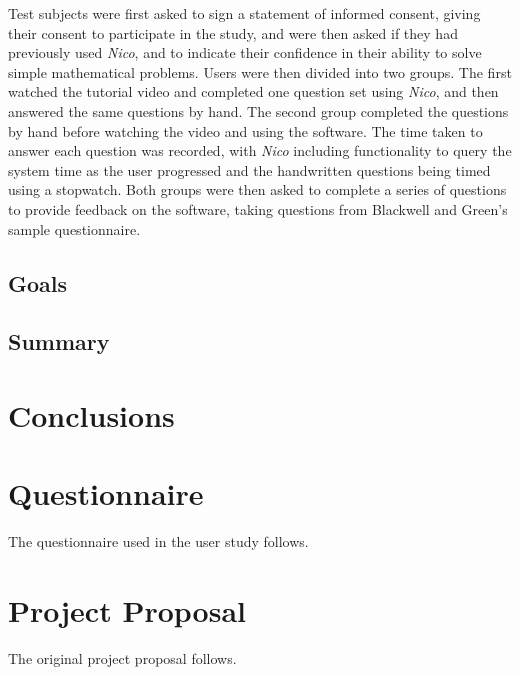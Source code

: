\documentclass[12pt,twoside,notitlepage,xetex]{report}
\begin{document}
Test subjects were first asked to sign a statement of informed consent, giving their consent to participate in the study, and were then asked if they had previously used \emph{Nico}, and to indicate their confidence in their ability to solve simple mathematical problems.  Users were then divided into two groups.  The first watched the tutorial video and completed one question set using \emph{Nico}, and then answered the same questions by hand.  The second group completed the questions by hand before watching the video and using the software.  The time taken to answer each question was recorded, with \emph{Nico} including functionality to query the system time as the user progressed and the handwritten questions being timed using a stopwatch.  Both groups were then asked to complete a series of questions to provide feedback on the software, taking questions from Blackwell and Green's sample questionnaire. \cite{Blackwell2000}

\section{Goals}

\section{Summary}


\cleardoublepage
\chapter{Conclusions}





\cleardoublepage



\cleardoublepage

\appendix

\chapter{Questionnaire}

The questionnaire used in the user study follows.



\cleardoublepage

\chapter{Project Proposal}

The original project proposal follows.


% 
\end{document}
